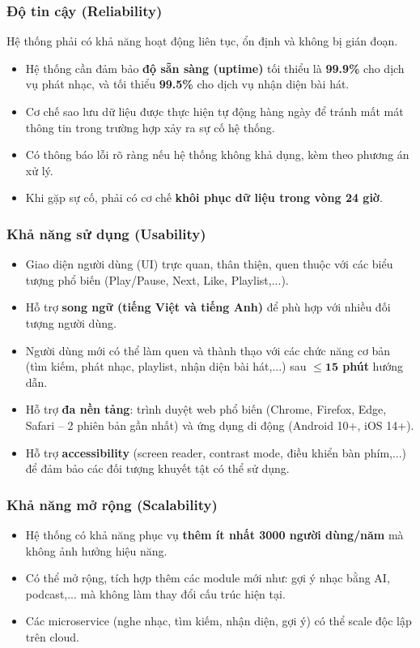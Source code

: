\documentclass[a4paper]{article}
\begin{document}
\subsubsection{Độ tin cậy (Reliability)}
  Hệ thống phải có khả năng hoạt động liên tục, ổn định và không bị gián đoạn.
  \begin{itemize}
      \item Hệ thống cần đảm bảo \textbf{độ sẵn sàng (uptime)} tối thiểu là \textbf{99.9\%} cho dịch vụ phát nhạc, và tối thiểu \textbf{99.5\%} cho dịch vụ nhận diện bài hát.
      \item Cơ chế sao lưu dữ liệu được thực hiện tự động hàng ngày để tránh mất mát thông tin trong trường hợp xảy ra sự cố hệ thống.
      \item Có thông báo lỗi rõ ràng nếu hệ thống không khả dụng, kèm theo phương án xử lý.
      \item Khi gặp sự cố, phải có cơ chế \textbf{khôi phục dữ liệu trong vòng 24 giờ}.
  \end{itemize}

\subsubsection{Khả năng sử dụng (Usability)}
  \begin{itemize}
      \item Giao diện người dùng (UI) trực quan, thân thiện, quen thuộc với các biểu tượng phổ biến (Play/Pause, Next, Like, Playlist,...).
      \item Hỗ trợ \textbf{song ngữ (tiếng Việt và tiếng Anh)} để phù hợp với nhiều đối tượng người dùng.
      \item Người dùng mới có thể làm quen và thành thạo với các chức năng cơ bản (tìm kiếm, phát nhạc, playlist, nhận diện bài hát,...) sau \textbf{$\leq \mathbf{15}$ phút} hướng dẫn.
      \item Hỗ trợ \textbf{đa nền tảng}: trình duyệt web phổ biến (Chrome, Firefox, Edge, Safari – 2 phiên bản gần nhất) và ứng dụng di động (Android 10+, iOS 14+).
      \item Hỗ trợ \textbf{accessibility} (screen reader, contrast mode, điều khiển bàn phím,...) để đảm bảo các đối tượng khuyết tật có thể sử dụng.
  \end{itemize}

\subsubsection{Khả năng mở rộng (Scalability)}
  \begin{itemize}
      \item Hệ thống có khả năng phục vụ \textbf{thêm ít nhất 3000 người dùng/năm} mà không ảnh hưởng hiệu năng.
      \item Có thể mở rộng, tích hợp thêm các module mới như: gợi ý nhạc bằng AI, podcast,... mà không làm thay đổi cấu trúc hiện tại.
      \item Các microservice (nghe nhạc, tìm kiếm, nhận diện, gợi ý) có thể scale độc lập trên cloud.
  \end{itemize}
\end{document}
